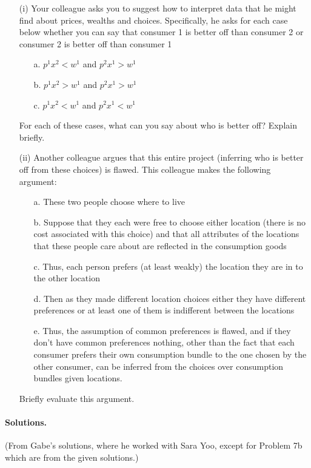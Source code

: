 \documentclass[12pt]{article}
\begin{document}
\begin{enumerate}
	\begin{itemize}
		\item[(i)] Your colleague asks you to suggest how to interpret data that he might find about prices, wealths and choices. Specifically, he asks for each case below whether you can say that consumer 1 is better off than consumer 2 or consumer 2 is better off than consumer 1
		\begin{itemize}
			\item[a.] $p^1x^2 < w^1$ and $p^2x^1 > w^1$
			\item[b.] $p^1x^2 > w^1$ and $p^2x^1 > w^1$
			\item[c.] $p^1x^2 < w^1$ and $p^2x^1 < w^1$
		\end{itemize}
		For each of these cases, what can you say about who is better off? Explain briefly.
		
		\item[(ii)] Another colleague argues that this entire project (inferring who is better off from these choices) is flawed. This colleague makes the following argument:
		\begin{itemize}
			\item[a.] These two people choose where to live
			\item[b.] Suppose that they each were free to choose either location (there is no cost associated with this choice) and that all attributes of the locations that these people care about are reflected in the consumption goods
			\item[c.] Thus, each person prefers (at least weakly) the location they are in to the other location
			\item[d.] Then as they made different location choices either they have different preferences or at least one of them is indifferent between the locations
			\item[e.] Thus, the assumption of common preferences is flawed, and if they don't have common preferences nothing, other than the fact that each consumer prefers their own consumption bundle to the one chosen by the other consumer, can be inferred from the choices over consumption bundles given locations.
		\end{itemize}
		Briefly evaluate this argument.
	\end{itemize}
\end{enumerate}

\paragraph{Solutions.} (From Gabe's solutions, where he worked with Sara Yoo, except for Problem 7b which are from the given solutions.)
\end{document}
